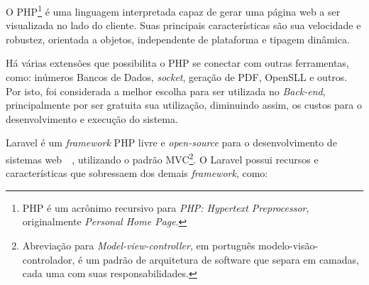 \documentclass[
  12pt,				%
  openany,
  oneside,
  a4paper,			%
  english,			%
  brazil
]{article}
\numberwithin{figure}{section}
\numberwithin{table}{section}
\newcounter{subsubsubsection}[subsubsection]
\begin{document}
O PHP\footnote{PHP é um acrônimo recursivo para \textit{PHP: Hypertext Preprocessor}, originalmente \textit{Personal Home Page}.} é uma linguagem interpretada capaz de gerar uma página web a ser visualizada no lado do cliente. Suas principais características são sua velocidade e robustez, orientada a objetos, independente de plataforma e tipagem dinâmica.

Há várias extensões que possibilita o PHP se conectar com outras ferramentas, como: inúmeros Bancos de Dados, \textit{socket}, geração de PDF, OpenSLL e outros. Por isto, foi considerada a melhor escolha para ser utilizada no \textit{Back-end}, principalmente por ser gratuita sua utilização, diminuindo assim, os custos para o desenvolvimento e execução do sistema.



Laravel é um \textit{framework} PHP livre e \textit{open-source} para o desenvolvimento de sistemas web~\cite{laravel5}~\cite{laravel_kiliccdaugi}, utilizando o padrão MVC\footnote{Abreviação para \textit{Model-view-controller}, em português modelo-visão-controlador, é um padrão de arquitetura de software que separa em camadas, cada uma com suas responsabilidades.}. O Laravel possui recursos e características que sobressaem dos demais \textit{framework}, como:
\end{document}
